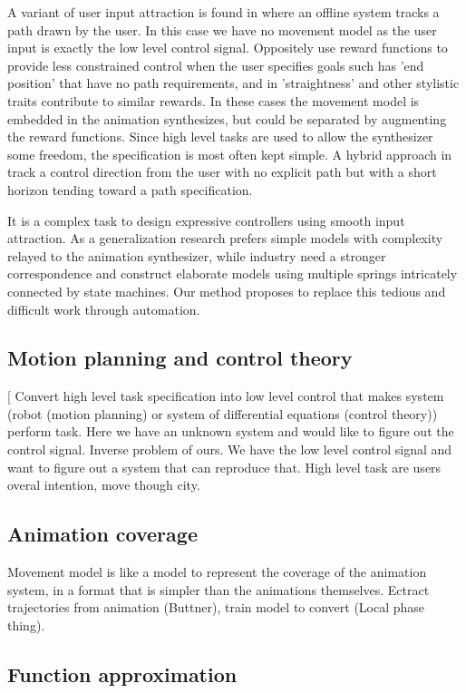 A variant of user input attraction is found in \citep{treuille07} where an offline system tracks a path drawn by the user. In this case we have no movement model as the user input is exactly the low level control signal. Oppositely \citep{kovar02} use reward functions to provide less constrained control when the user specifies goals such has 'end position' that have no path requirements, and in \citep{lee18} 'straightness' and other stylistic traits contribute to similar rewards. In these cases the movement model is embedded in the animation synthesizes, but could be separated by augmenting the reward functions. Since high level tasks are used to allow the synthesizer some freedom, the specification is most often kept simple. A hybrid approach in \citep{lee10} track a control direction from the user with no explicit path but with a short horizon tending toward a path specification.

It is a complex task to design expressive controllers using smooth input attraction. As a generalization research prefers simple models with complexity relayed to the animation synthesizer, while industry need a stronger correspondence and construct elaborate models using multiple springs intricately connected by state machines. Our method proposes to replace this tedious and difficult work through automation. 

\subsection{Motion planning and control theory}
[
Convert high level task specification into low level control that makes system (robot (motion planning) or system of differential equations (control theory)) perform task.
Here we have an unknown system and would like to figure out the control signal. Inverse problem of ours. We have the low level control signal and want to figure out a system that can reproduce that. High level task are users overal intention, move though city.

\subsection{Animation coverage}
Movement model is like a model to represent the coverage of the animation system, in a format that is simpler than the animations themselves. Ectract trajectories from animation (Buttner), train model to convert (Local phase thing). 

\subsection{Function approximation}

